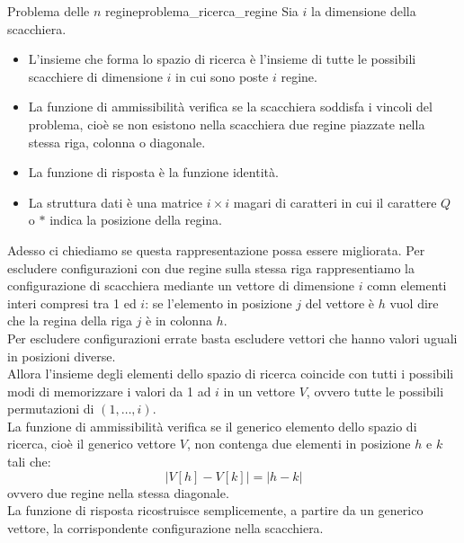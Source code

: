 \documentclass[12pt]{report}
\newcommand{\nmu}{}
\begin{document}
   \begin{example}{\nmu Problema delle $n$ regine}{problema_ricerca_regine}
   	Sia $i$ la dimensione della scacchiera.
 	\begin{itemize}
 		\item L'insieme che forma lo spazio di ricerca è l'insieme di tutte le possibili scacchiere di dimensione $i$ in cui sono poste $i$ regine.
 		\item La funzione di ammissibilità verifica se la scacchiera soddisfa i vincoli del problema, cioè se non esistono nella scacchiera due regine piazzate nella stessa riga, colonna o diagonale. \\
 		\item La funzione di risposta è la funzione identità.
 		\item La struttura dati è una matrice $i \times i$ magari di caratteri in cui il carattere $Q$ o $*$ indica la posizione della regina.
 	\end{itemize}
 	Adesso ci chiediamo se questa rappresentazione possa essere migliorata. Per escludere configurazioni con due regine sulla stessa riga rappresentiamo la configurazione di scacchiera mediante un vettore di dimensione $i$ comn elementi interi compresi tra 1 ed $i$: se l'elemento in posizione $j$ del vettore è $h$ vuol dire che la regina della riga $j$ è in colonna $h$. \\
 	Per escludere configurazioni errate basta escludere vettori che hanno valori uguali in posizioni diverse. \\
 	Allora l'insieme degli elementi dello spazio di ricerca coincide con tutti i possibili modi di memorizzare i valori da 1 ad $i$ in un vettore $V$, ovvero tutte le possibili permutazioni di $(1, \dots, i)$. \\
 	La funzione di ammissibilità verifica se il generico elemento dello spazio di ricerca, cioè il generico vettore $V$, non contenga due elementi in posizione $h$ e $k$ tali che:
 	\[
 	\left|V[h] - V[k]\right| = \left| h-k\right|
 	\]
 	ovvero due regine nella stessa diagonale. \\
 	La funzione di risposta ricostruisce semplicemente, a partire da un generico vettore, la corrispondente configurazione nella scacchiera.
 	\end{example}
\end{document}
